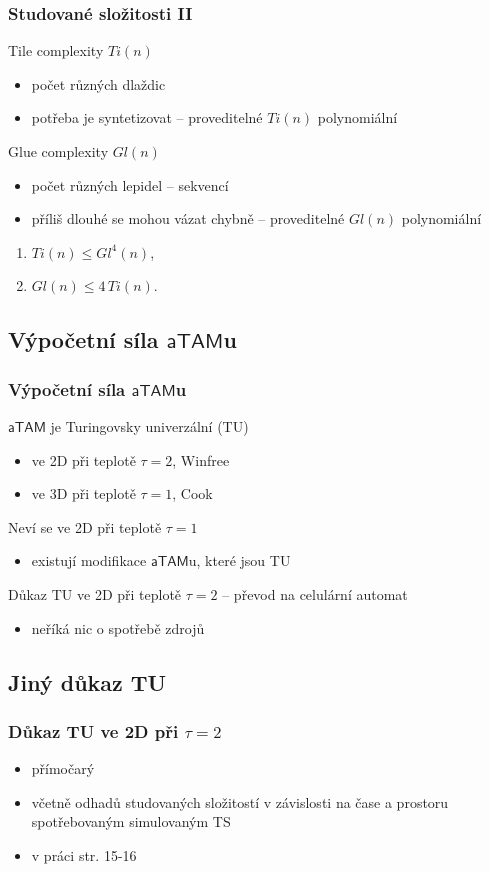 \documentclass[10pt]{beamer}
\newcommand{\atam}{\mathsf{aTAM}}
\theoremstyle{definition}
\theoremstyle{remark}
\begin{document}
\begin{frame}
\frametitle{Studované složitosti II}
	Tile complexity $Ti(n)$
	\begin{itemize}
		\item počet různých dlaždic
		\item potřeba je syntetizovat -- proveditelné $Ti(n)$ polynomiální
	\end{itemize}
	Glue complexity $Gl(n)$
	\begin{itemize}
		\item počet různých lepidel -- sekvencí
		\item příliš dlouhé se mohou vázat chybně -- proveditelné $Gl(n)$ polynomiální
	\end{itemize}
	\pause
	\begin{lemma}
		\begin{enumerate}
			\item $Ti(n) \leq Gl^4(n)$,
			\item $Gl(n) \leq 4\,Ti(n)$.
		\end{enumerate}
	\end{lemma}
\end{frame}

\subsection{Výpočetní síla $\atam$u}
\begin{frame}
\frametitle{Výpočetní síla $\atam$u}
	$\atam$ je Turingovsky univerzální (TU)
	\begin{itemize}
		\item ve 2D při teplotě $\tau=2$, Winfree \cite{winfree_phd}
		\item ve 3D při teplotě $\tau=1$, Cook \cite{cook_temp1}
	\end{itemize}
	Neví se ve 2D při teplotě $\tau=1$
	\begin{itemize}
		\item existují modifikace $\atam$u, které jsou TU
	\end{itemize}
	Důkaz TU ve 2D při teplotě $\tau=2$ -- převod na celulární automat
	\begin{itemize}
		\item neříká nic o spotřebě zdrojů
	\end{itemize}
\end{frame}

\subsection{Jiný důkaz TU}
\begin{frame}
\frametitle{Důkaz TU ve 2D při $\tau=2$}
	\begin{itemize}
		\item přímočarý
		\item včetně odhadů studovaných složitostí v závislosti na čase a prostoru spotřebovaným simulovaným TS
		\item v práci str. 15-16
	\end{itemize}
\end{frame}
\end{document}
